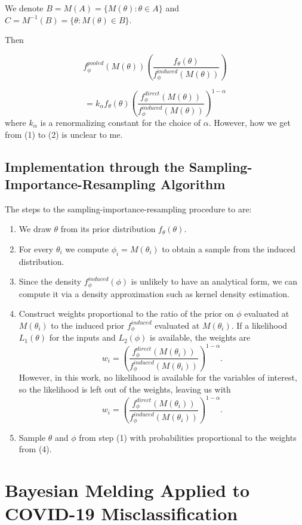 \documentclass[12pt,twoside]{smiththesis}
\providecommand{\tightlist}{%
  \setlength{\itemsep}{0pt}\setlength{\parskip}{0pt}}
\begin{document}
We denote \(B = M(A) = \{M(\theta) : \theta \in A \}\) and \(C = M^{-1}(B) = \{\theta: M(\theta) \in B \}\).

Then

\[
f_\phi^{pooled} (M(\theta)) \left( \frac{f_\theta(\theta)}{f_\phi^{induced}(M(\theta))} \right) \tag{1}
\]

\[
=k_{\alpha} f_\theta(\theta) \left( \frac{f_\phi^{direct}(M(\theta))}{f_\phi^{induced}(M(\theta))} \right)^{1-\alpha} \tag{2}
\]
where \(k_\alpha\) is a renormalizing constant for the choice of \(\alpha\). However, how we get from (1) to (2) is unclear to me.

\hypertarget{implementation-through-the-sampling-importance-resampling-algorithm}{%
\subsection{Implementation through the Sampling-Importance-Resampling Algorithm}\label{implementation-through-the-sampling-importance-resampling-algorithm}}

The steps to the sampling-importance-resampling procedure to are:
\begin{enumerate}
\def\labelenumi{\arabic{enumi}.}
\tightlist
\item
  We draw \(\theta\) from its prior distribution \(f_\theta(\theta)\).
\item
  For every \(\theta_i\) we compute \(\phi_i = M(\theta_i)\) to obtain a sample from the induced distribution.
\item
  Since the density \(f_\phi^{induced}(\phi)\) is unlikely to have an analytical form, we can compute it via a density approximation such as kernel density estimation.
\item
  Construct weights proportional to the ratio of the prior on \(\phi\) evaluated at \(M(\theta_i)\) to the induced prior \(f_\phi^{induced}\) evaluated at \(M(\theta_i)\). If a likelihood \(L_1(\theta)\) for the inputs and \(L_2(\phi)\) is available, the weights are
  \[w_i = \left( \frac{f_\phi^{direct}(M(\theta_i))}{f_\phi^{induced}(M(\theta_i))} \right)^{1-\alpha}.\]
  However, in this work, no likelihood is available for the variables of interest, so the likelihood is left out of the weights, leaving us with
  \[w_i = \left( \frac{f_\phi^{direct}(M(\theta_i))}{f_\phi^{induced}(M(\theta_i))} \right)^{1-\alpha}.\]
\item
  Sample \(\theta\) and \(\phi\) from step (1) with probabilities proportional to the weights from (4).
\end{enumerate}
\hypertarget{bayesian-melding-applied-to-covid-19-misclassification}{%
\section{Bayesian Melding Applied to COVID-19 Misclassification}\label{bayesian-melding-applied-to-covid-19-misclassification}}
\end{document}
